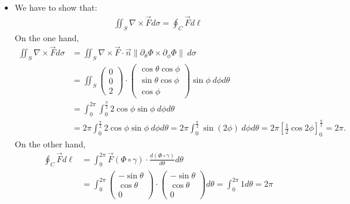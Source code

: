 \documentclass[11pt]{article}
\begin{document}
\begin{solution}
\begin{itemize}
    \item 
    We have to show that:
    \begin{gather*}
        \iint_S \nabla \times \vec{F} d\sigma = \oint_C \vec{F} d\ell
    \end{gather*}
    On the one hand,
    \begin{align*}
        \iint_S \nabla \times \vec{F} d\sigma 
        &
        = \iint_S \nabla \times \vec{F}\cdot \vec{n}\|\partial_{\theta}\Phi\times \partial_{\phi}\Phi\| \ d\sigma
        \\&
        = 
        \iint_S 
        \begin{pmatrix} 0\\ 0\\ 2 \end{pmatrix}
        \cdot
        \begin{pmatrix}    
            \cos\theta\cos\phi 
            \\ 
            \sin\theta\cos\phi 
            \\ 
            \cos\phi
        \end{pmatrix}
        \sin\phi \ d\phi d\theta 
        \\&
        = 
        \int_0^{2\pi}\int_0^{\frac{\pi}{2}} 2\cos\phi\sin\phi \ d\phi d\theta
        \\&
        = 
        2\pi \int_0^{\frac{\pi}{2}} 2\cos\phi\sin\phi \ d\phi d\theta
        = 
        2\pi \int_0^{\frac{\pi}{2}} \sin(2\phi) \ d\phi d\theta
        = 
        2\pi \left[ \frac{1}{2}\cos2\phi \right]_0^{\frac{\pi}{2}}
        = 
        2\pi
        .
    \end{align*}   
    On the other hand,
    \begin{align*}
        \oint_C \vec{F} d\ell 
        &
        = 
        \int_0^{2\pi} \vec{F}(\Phi\circ \gamma)\cdot \frac{d(\Phi\circ \gamma)}{d\theta}  d \theta
        \\&
        = 
        \int_0^{2\pi} 
        \begin{pmatrix} -\sin\theta \\ \cos\theta \\ 0 \end{pmatrix}
        \cdot 
        \begin{pmatrix} -\sin\theta \\ \cos\theta \\ 0 \end{pmatrix} 
        d \theta
        = \int_0^{2\pi} 1 d \theta = 2\pi\\
    \end{align*}   
    \end{itemize}
\end{solution}
\end{document}
